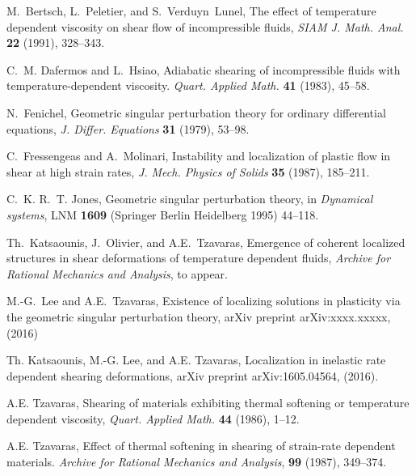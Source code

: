 \documentclass[a4paper,11pt]{article}
\begin{document}
\begin{thebibliography}{10}

{\sc M.~Bertsch, L.~Peletier, and S.~Verduyn~Lunel}, 
The effect of temperature dependent viscosity on shear flow of  incompressible fluids,
{\em SIAM J. Math. Anal.} {\bf 22 } (1991), 328--343.

{\sc C.~M. Dafermos and L.~Hsiao}, 
Adiabatic shearing of incompressible fluids with temperature-dependent viscosity.
{\em Quart.  Applied Math.} {\bf 41} (1983), 45--58.

{\sc N.~Fenichel}, 
Geometric singular perturbation theory for ordinary differential equations, 
{\it J. Differ. Equations} {\bf 31} (1979), 53--98.

{\sc C.~Fressengeas and A.~Molinari}, 
Instability and localization of plastic flow in shear at high strain rates, 
  {\em J.  Mech. Physics of Solids} {\bf 35} (1987), 185--211.

{\sc C.~K. R.~T. Jones}, 
Geometric singular perturbation theory, in {\it Dynamical systems}, LNM {\bf 1609} (Springer Berlin Heidelberg 1995) 44--118.
  
  
{\sc Th.~Katsaounis, J.~Olivier, and A.E.~Tzavaras}, 
Emergence of coherent localized structures in shear deformations of
  temperature dependent fluids, {\em Archive for Rational Mechanics and Analysis}, to appear.

{\sc M.-G.~Lee and A.E.~Tzavaras},
Existence of localizing solutions in plasticity via the geometric singular perturbation theory, arXiv preprint arXiv:xxxx.xxxxx,  (2016)

{\sc Th. Katsaounis, M.-G. Lee, and A.E. Tzavaras}, 
Localization in inelastic rate dependent shearing deformations, arXiv preprint arXiv:1605.04564,  (2016).


{\sc A.E. Tzavaras},
Shearing of materials exhibiting thermal softening or temperature dependent viscosity,
{\em Quart.  Applied Math.} {\bf 44} (1986), 1--12.

{\sc A.E. Tzavaras}, 
Effect of thermal softening in shearing of strain-rate dependent materials.
{\em Archive for Rational Mechanics and Analysis}, {\bf 99} (1987), 349--374.


\end{thebibliography}
\end{document}
